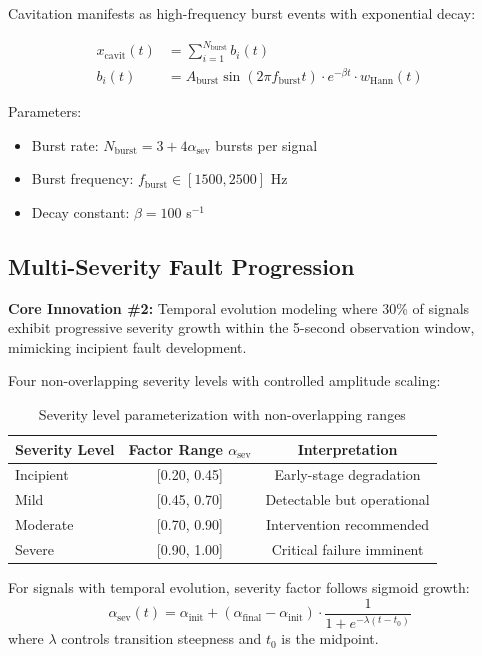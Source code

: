 \documentclass[11pt,a4paper]{article}
\begin{document}
Cavitation manifests as high-frequency burst events with exponential decay:

\begin{align}
x_{\text{cavit}}(t) &= \sum_{i=1}^{N_{\text{burst}}} b_i(t) \\
b_i(t) &= A_{\text{burst}} \sin(2\pi f_{\text{burst}} t) \cdot e^{-\beta t} \cdot w_{\text{Hann}}(t) \label{eq:cavitation}
\end{align}

Parameters:
\begin{itemize}[itemsep=0.1em]
    \item Burst rate: $N_{\text{burst}} = 3 + 4\alpha_{\text{sev}}$ bursts per signal
    \item Burst frequency: $f_{\text{burst}} \in [1500, 2500]$ Hz
    \item Decay constant: $\beta = 100$ s$^{-1}$
\end{itemize}

\subsection{Multi-Severity Fault Progression}

\begin{innovation}
\textbf{Core Innovation \#2:} Temporal evolution modeling where 30\% of signals exhibit progressive severity growth within the 5-second observation window, mimicking incipient fault development.
\end{innovation}

Four non-overlapping severity levels with controlled amplitude scaling:

\begin{table}[h]
\centering
\begin{tabular}{@{}lcc@{}}
\toprule
\textbf{Severity Level} & \textbf{Factor Range} $\alpha_{\text{sev}}$ & \textbf{Interpretation} \\
\midrule
Incipient & [0.20, 0.45] & Early-stage degradation \\
Mild & [0.45, 0.70] & Detectable but operational \\
Moderate & [0.70, 0.90] & Intervention recommended \\
Severe & [0.90, 1.00] & Critical failure imminent \\
\bottomrule
\end{tabular}
\caption{Severity level parameterization with non-overlapping ranges}
\end{table}

For signals with temporal evolution, severity factor follows sigmoid growth:
\begin{equation}
\alpha_{\text{sev}}(t) = \alpha_{\text{init}} + (\alpha_{\text{final}} - \alpha_{\text{init}}) \cdot \frac{1}{1 + e^{-\lambda(t - t_0)}}
\end{equation}
where $\lambda$ controls transition steepness and $t_0$ is the midpoint.
\end{document}
